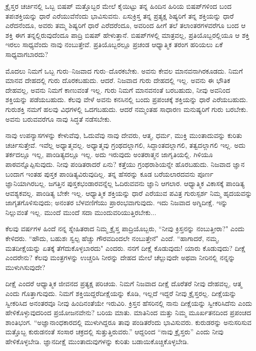  ಕ್ರೈಸ್ತರ ಚರ್ಚಿನಲ್ಲಿ ಒಬ್ಬ ಬಿಷಪ್ ಮತ್ತೊಬ್ಬರ ಮೇಲೆ ಕೈಯಿಟ್ಟು ತನ್ನ ಹಿಂದಿನ ಹಿರಿಯ ಬಿಷಪ್‌ಗಳಿಂದ ಬಂದ ತಪಃಶಕ್ತಿಯನ್ನು ಧಾರೆ ಎರೆಯುವೆನೆಂದು ಭಾವಿಸುವನು. ಏಸುಕ್ರಿಸ್ತ ತನ್ನ ಪ್ರತ್ಯಕ್ಷ ಶಿಷ್ಯರಿಗೆ ತನ್ನ ಶಕ್ತಿಯನ್ನು ಧಾರೆ ಎರೆದನೆಂದೂ, ಅವರು ತಮ್ಮ ಶಿಷ್ಯರಿಗೆ ಧಾರೆ ಎರೆದರೆಂದೂ, ಅವರಿಂದ ಹೀಗೆ ತಲೆ ತಲಾಂತರಗಳವರೆಗೂ ಬಂದ ಆ ಶಕ್ತಿ ಈಗ ತನ್ನಲ್ಲಿರುವುದೆಂದೂ ಪಾದ್ರಿ ಬಿಷಪ್ ಹೇಳುತ್ತಾನೆ. ಬಿಷಪ್‌ಗಳಲ್ಲಿ ಮಾತ್ರವಲ್ಲ, ಪ್ರತಿಯೊಬ್ಬರಲ್ಲಿಯೂ ಆ ಶಕ್ತಿ ಇರಲು ಸಾಧ್ಯವೆಂದು ನಾವು ನಂಬುತ್ತೇವೆ. ಪ್ರತಿಯೊಬ್ಬರಲ್ಲೂ ಪ್ರಚಂಡ ಆಧ್ಯಾತ್ಮಿಕ ತರಂಗ ಹರಿಯಲು ಏಕೆ ಸಾಧ್ಯವಾಗಬಾರದು?

ಮೊದಲು ನಿಮಗೆ ಒಬ್ಬ ಗುರು–ನಿಜವಾದ ಗುರು–ದೊರಕಬೇಕು. ಅವನು ಕೇವಲ ಮಾನವನಾಗಿರಕೂಡದು. ನಿಮಗೆ ಮಾನವ ದೇಹದಲ್ಲಿ ಗುರು ದೊರಕಬಹುದು. ಆದರೆ. ನಿಜವಾದ ಗುರು ದೇಹದಲ್ಲಿ ಇಲ್ಲ. ಅವನು ಈ ಭೌತಿಕ ದೇಹವಲ್ಲ, ಅವನು ನಿಮಗೆ ಕಾಣುವಂತೆ ಇಲ್ಲ. ಗುರು ನಿಮಗೆ ಮಾನವನಂತೆ ಬರಬಹುದು, ನೀವು ಅವನಿಂದ ಶಕ್ತಿಯನ್ನು ಪಡೆಯಬಹುದು. ಕೆಲವು ವೇಳೆ ಅವನು ಕನಸಿನಲ್ಲಿ ಬಂದು ಪ್ರಪಂಚಕ್ಕೆ ಶಕ್ತಿಯನ್ನು ಧಾರೆ ಎರೆಯಬಹುದು. ಗುರುಶಕ್ತಿ ನಮಗೆ ಹಲವು ವಿಧಗಳಲ್ಲಿ ಒದಗಬಹುದು. ಆದರೆ ನಮ್ಮಂತಹ ಸಾಧಾರಣ ಮನುಷ್ಯರಿಗೆ ಗುರು ಬರಬೇಕು. ಅವನು ಬರುವವರೆಗೂ ನಾವು ಸಿದ್ಧತೆ ನಡೆಸಬೇಕು.

ನಾವು ಉಪನ್ಯಾಸಗಳನ್ನು ಕೇಳುವೆವು, ಓದುವೆವು ನಾವು ದೇವರು, ಆತ್ಮ, ಧರ್ಮ, ಮುಕ್ತಿ ಮುಂತಾದುವನ್ನು ಕುರಿತು ಚರ್ಚಿಸುತ್ತೇವೆ. ಇವೆಲ್ಲ ಅಧ್ಯಾತ್ಮವಲ್ಲ. ಅಧ್ಯಾತ್ಮವು ಗ್ರಂಥದಲ್ಲಾಗಲಿ, ಸಿದ್ದಾಂತದಲ್ಲಾಗಲಿ, ತತ್ವದಲ್ಲಾಗಲಿ ಇಲ್ಲ. ಅದು ತರ್ಕದಲ್ಲೂ ಇಲ್ಲ, ಪಾಂಡಿತ್ಯದಲ್ಲೂ ಇಲ್ಲ. ಅದು ಇರುವುದು ಅಂತರಾತ್ಮನ ಜಾಗೃತಿಯಲ್ಲಿ. ಗಿಳಿಯೂ ಪಾಠವನ್ನೊಪ್ಪಿಸುವುದು. ನೀವು ಪಂಡಿತರಾದರೆ ಏನು? ಕತ್ತೆಯು ಗ್ರಂಥರಾಶಿಯನ್ನೇ ಹೊರಬಹುದು. ನಿಜವಾದ ಜ್ಞಾನ ಬಂದಾಗ ಇಂತಹ ಪುಸ್ತಕ ಪಾಂಡಿತ್ಯವಿರುವುದಿಲ್ಲ. ತನ್ನ ಹೆಸರನ್ನು ಕೂಡ ಬರೆಯಲಾರದವನು ಪೂರ್ಣ ಜ್ಞಾನಿಯಾಗಿರಬಲ್ಲ. ಜಗತ್ತಿನ ಪುಸ್ತಕಭಂಡಾರವನ್ನೆಲ್ಲ ಓದಿರುವವನು ಜ್ಞಾನಿ ಆಗಲಾರ. ಆಧ್ಯಾತ್ಮಿಕ ವಿಕಾಸಕ್ಕೆ ಪಾಂಡಿತ್ಯ ಆವಶ್ಯಕವಲ್ಲ. ಪಾಂಡಿತ್ಯ ಬೇಕೇ ಇಲ್ಲ. ಆಧ್ಯಾತ್ಮಿಕ ಶಕ್ತಿಯನ್ನು ಧಾರೆ ಎರೆಯುವ ಪವಿತ್ರ ಗುರುಸ್ಪರ್ಶ ನಿಮ್ಮ ಹೃದಯವನ್ನು ಜಾಗೃತಗೊಳಿಸುವುದು; ಅನಂತರ ಬೆಳವಣಿಗೆಯು ಪ್ರಾರಂಭವಾಗುವುದು. ಇದು ನಿಜವಾದ ಅಗ್ನಿದೀಕ್ಷೆ. ಇನ್ನು ನಿಲ್ಲುವಂತೆ ಇಲ್ಲ. ಮುಂದೆ ಮುಂದೆ ಸದಾ ಮುಂದುವರಿಯುತ್ತಿರಬೇಕು...

ಕೆಲವು ವರ್ಷಗಳ ಹಿಂದೆ ನನ್ನ ಸ್ನೇಹಿತರಾದ ನಿಮ್ಮ ಕ್ರೈಸ್ತ ಪಾದ್ರಿಯೊಬ್ಬರು, “ನೀವು ಕ್ರಿಸ್ತನನ್ನು ನಂಬುತ್ತೀರಾ?" ಎಂದು ಕೇಳಿದರು. “ಹೌದು, ಬಹುಶಃ ಸ್ವಲ್ಪ ಹೆಚ್ಚು ಗೌರವದಿಂದಲೇ ನಂಬುತ್ತೇನೆ" ಎಂದೆ. “ಹಾಗಾದರೆ, ನಮ್ಮ, ಮತದೀಕ್ಷೆಯನ್ನು ಏತಕ್ಕೆ ತೆಗೆದುಕೊಳ್ಳಬಾರದು" ಎಂದರು. ನನಗೆ ದೀಕ್ಷೆ ಕೊಡುವುದು! ಯಾರು ಕೊಡುವುದು? ದೀಕ್ಷೆ ಎಂದರೇನು? ಕೆಲವು ಮಂತ್ರಗಳನ್ನು ಉಚ್ಚರಿಸಿ ನೀರನ್ನು ದೇಹದ ಮೇಲೆ ಚೆಲ್ಲುವುದೇ ಅಥವಾ ನೀರಿನಲ್ಲಿ ನನ್ನನ್ನು ಮುಳುಗಿಸುವುದೇ?

ದೀಕ್ಷೆ ಎಂದರೆ ಆಧ್ಯಾತ್ಮಿಕ ಜೀವನದ ಪ್ರತ್ಯಕ್ಷ ಪರಿಚಯ. ನಿಮಗೆ ನಿಜವಾದ ದೀಕ್ಷೆ ದೊರೆತರೆ ನೀವು ದೇಹವಲ್ಲ, ಆತ್ಮ ಎಂದು ಗೊತ್ತಾಗುವುದು. ನಿಮಗೆ ಶಕ್ತಿಯಿದ್ದರೆ\break ದೀಕ್ಷೆಯನ್ನು ಕೊಡಿ, ಇಲ್ಲದೆ ಇದ್ದರೆ ನೀವು ಕ್ರೈಸ್ತರಲ್ಲ. ದೀಕ್ಷೆಯನ್ನು ಸ್ವೀಕರಿಸಿದ ಅನಂತರವೂ ನೀವು ಹಿಂದಿನಂತೆಯೇ ಇರುವಿರಿ. ಕ್ರಿಸ್ತನ ಹೆಸರಿನಲ್ಲಿ ನಾನು ದೀಕ್ಷೆಯನ್ನು ಸ್ವೀಕರಿಸಿದೆನು ಎಂದು ಹೇಳಿಕೊಳ್ಳುವುದರಿಂದ ಪ್ರಯೋಜನವೇನು? ಬರಿಯ ಮಾತು. ಮಾತಿನಿಂದ ಮತ್ತು ನಿಮ್ಮ ಮೂರ್ಖತನದಿಂದ ಪ್ರಪಂಚದ ಶಾಂತಿಭಂಗ. “ಅಜ್ಞಾನಾಂಧಕಾರದಲ್ಲಿ ಮುಳುಗಿದ್ದರೂ ತಾವು ಪಂಡಿತರೆಂದು ಭಾವಿಸುವರು. ಕುರುಡರನ್ನು ಅನುಸರಿಸುವ ಮತ್ತೊಬ್ಬ ಕುರುಡನಂತೆ ಸಂಸಾರ ಚಕ್ರದಲ್ಲಿ ಸುತ್ತುತ್ತಿರುವರು.” ಆದ್ದರಿಂದ “ನಾವು ಕ್ರೈಸ್ತರು'' ಎಂದು ನೀವು ಹೇಳಿಕೊಳ್ಳಬೇಡಿ. ಜ್ಞಾನದೀಕ್ಷೆ ಮುಂತಾದುವುಗಳನ್ನು ಕುರಿತು ಬಡಾಯಿಕೊಚ್ಚಿಕೊಳ್ಳಬೇಡಿ.


